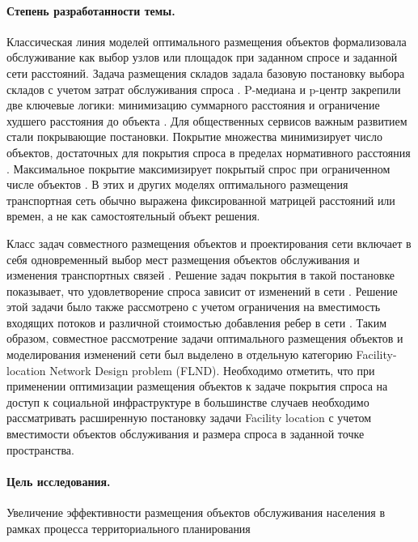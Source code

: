 \paragraph*{Степень разработанности темы.}

Классическая линия моделей оптимального размещения объектов формализовала обслуживание как выбор узлов или площадок при заданном спросе и заданной сети расстояний. Задача размещения складов задала базовую постановку выбора складов с учетом затрат обслуживания спроса \cite{kuehn1963warehouse}. P-медиана и p-центр закрепили две ключевые логики: минимизацию суммарного расстояния и ограничение худшего расстояния до объекта \cite{hakimi1964medians}. Для общественных сервисов важным развитием стали покрывающие постановки. Покрытие множества минимизирует число объектов, достаточных для покрытия спроса в пределах нормативного расстояния \cite{toregas1971emergency}. Максимальное покрытие максимизирует покрытый спрос при ограниченном числе объектов \cite{church1974mclp}. В этих и других моделях оптимального размещения транспортная сеть обычно выражена фиксированной матрицей расстояний или времен, а не как самостоятельный объект решения.

Класс задач совместного размещения объектов и проектирования сети включает в себя одновременный выбор мест размещения объектов обслуживания и изменения транспортных связей  \cite{daskin1993towardIntegrated} \cite{melkote1996integrated}. Решение задач покрытия в такой постановке показывает, что удовлетворение спроса зависит от изменений в сети \cite{melkote1998maximumCovering}. Решение этой задачи было также рассмотрено с учетом ограничения на вместимость входящих потоков и различной стоимостью добавления ребер в сети \cite{melkote2000capacitated}. Таким образом, совместное рассмотрение задачи оптимального размещения объектов и моделирования изменений сети был выделено в отдельную категорию Facility-location Network Design problem (FLND)\cite{melkote2001integrated}. Необходимо отметить, что при применении оптимизации размещения объектов к задаче покрытия спроса на доступ к социальной инфраструктуре в большинстве случаев необходимо рассматривать расширенную постановку задачи Facility location с учетом вместимости объектов обслуживания и размера спроса в заданной точке пространства.

\paragraph*{Цель исследования.}
Увеличение эффективности размещения объектов обслуживания населения в рамках процесса территориального планирования

